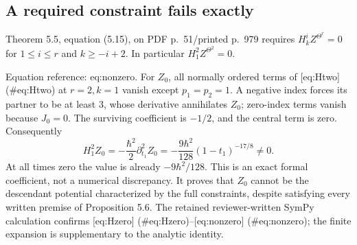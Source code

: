 \documentclass[10pt]{article}
\begin{document}
\subsection*{A required constraint fails exactly}
Theorem 5.5, equation (5.15), on PDF p. 51/printed p. 979 requires \(H_k^iZ^{\Theta^r}=0\) for \(1\le i\le r\) and \(k\ge-i+2\). In particular \(H_1^2Z^{\Theta^2}=0\).\par
Equation reference: eq:nonzero. For \(Z_0\), all normally ordered terms of [eq:Htwo] (\#eq:Htwo) at \(r=2,k=1\) vanish except \(p_1=p_2=1\). A negative index forces its partner to be at least \(3\), whose derivative annihilates \(Z_0\); zero-index terms vanish because \(J_0=0\). The surviving coefficient is \(-1/2\), and the central term is zero. Consequently \[
 H_1^2Z_0=-\frac{\hbar^2}{2}\partial_{t_1}^2Z_0
 =-\frac{9\hbar^2}{128}(1-t_1)^{-17/8}\ne0.\] At all times zero the value is already \(-9\hbar^2/128\). This is an exact formal coefficient, not a numerical discrepancy. It proves that \(Z_0\) cannot be the descendant potential characterized by the full constraints, despite satisfying every written premise of Proposition 5.6. The retained reviewer-written SymPy calculation confirms [eq:Hzero] (\#eq:Hzero)–[eq:nonzero] (\#eq:nonzero); the finite expansion is supplementary to the analytic identity.\par
\end{document}
